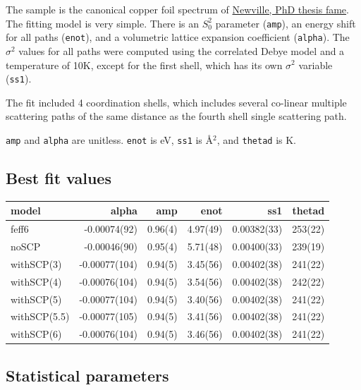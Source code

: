 \documentclass[11pt]{article}
\begin{document}
The sample is the canonical copper foil spectrum of
\href{https://github.com/XraySpectroscopy/XAS-Data-Interchange/issues/29}{Newville,
  PhD thesis fame}. The fitting model is very simple. There is an
$S_0^2$ parameter (\texttt{amp}), an energy shift for all paths
(\texttt{enot}), and a volumetric lattice expansion coefficient
(\texttt{alpha}). The $\sigma^2$ values for all paths were computed
using the correlated Debye model and a temperature of 10K, except for
the first shell, which has its own $\sigma^2$ variable (\texttt{ss1}).

The fit included 4 coordination shells, which includes several co-linear
multiple scattering paths of the same distance as the fourth shell
single scattering path.

\texttt{amp} and \texttt{alpha} are unitless. \texttt{enot} is eV,
\texttt{ss1} is {\AA}$^2$, and \texttt{thetad} is K.

\subsection{Best fit values}
\label{sec:orgheadline2}

\begin{center}
  \begin{tabular}{lrrrrr}
    model & alpha & amp & enot & ss1 & thetad\\
    \hline
    feff6        & -0.00074(92)  & 0.96(4) & 4.97(49) & 0.00382(33) & 253(22)\\
    noSCP        & -0.00046(90)  & 0.95(4) & 5.71(48) & 0.00400(33) & 239(19)\\
    withSCP(3)   & -0.00077(104) & 0.94(5) & 3.45(56) & 0.00402(38) & 241(22)\\
    withSCP(4)   & -0.00076(104) & 0.94(5) & 3.54(56) & 0.00402(38) & 242(22)\\
    withSCP(5)   & -0.00077(104) & 0.94(5) & 3.40(56) & 0.00402(38) & 241(22)\\
    withSCP(5.5) & -0.00077(105) & 0.94(5) & 3.41(56) & 0.00402(38) & 241(22)\\
    withSCP(6)   & -0.00076(104) & 0.94(5) & 3.46(56) & 0.00402(38) & 241(22)\\
  \end{tabular}
\end{center}

\subsection{Statistical parameters}
\label{sec:orgheadline3}
\end{document}
